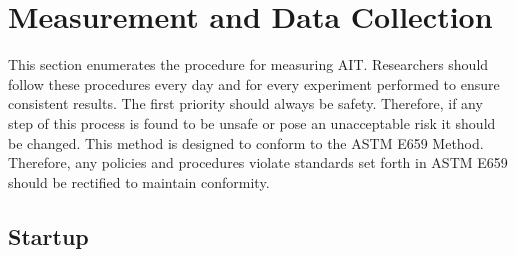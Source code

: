 \hypertarget{measurement-and-data-collection}{%
\section{Measurement and Data
Collection}\label{measurement-and-data-collection}}

This section enumerates the procedure for measuring AIT. Researchers
should follow these procedures every day and for every experiment
performed to ensure consistent results. The first priority should always
be safety. Therefore, if any step of this process is found to be unsafe
or pose an unacceptable risk it should be changed. This method is
designed to conform to the ASTM E659 Method. Therefore, any policies and
procedures violate standards set forth in ASTM E659 should be rectified
to maintain conformity.

\hypertarget{startup}{%
\subsection{Startup}\label{startup}}

